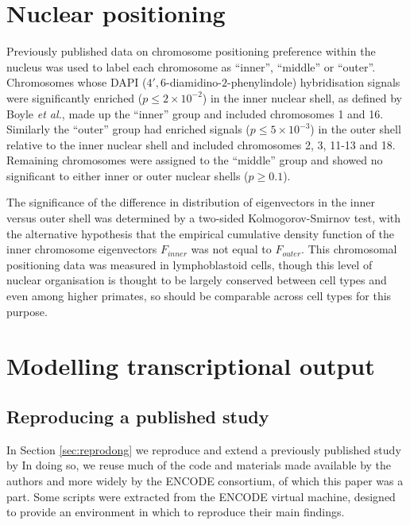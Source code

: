 \documentclass[a4paper,11pt,oneside]{book}
\begin{document}
\section{Nuclear positioning}\label{methods:positioning}

Previously published data  on chromosome positioning preference within
the nucleus was used to label each chromosome as ``inner'', ``middle''
or ``outer''.\cite{Boyle2001} Chromosomes whose DAPI ($4',6$-diamidino-$2$-phenylindole) hybridisation
signals were significantly enriched ($p\leq 2\times10^{-2}$) in the inner nuclear shell, as
defined by Boyle \emph{et al.}\cite{Boyle2001}, made up the ``inner''
group and included chromosomes 1 and 16. Similarly the ``outer'' group
had enriched signals ($p\leq 5\times10^{-3}$) in the outer shell relative to the inner nuclear
shell and included chromosomes 2, 3, 11-13 and 18. Remaining chromosomes were assigned to
the ``middle'' group and showed no significant to either inner or
outer nuclear shells ($p \geq 0.1$).\cite{Boyle2001} 

The significance of the difference in distribution of eigenvectors in the inner
versus outer shell was determined by a two-sided Kolmogorov-Smirnov test, with the alternative hypothesis that the empirical cumulative density function of the inner chromosome eigenvectors $F_{inner}$ was not equal to $F_{outer}$. This chromosomal positioning data was measured in lymphoblastoid cells, though this level of nuclear organisation is thought to be largely conserved
between cell types\cite{Chambers2013, DeWit2013} and even among higher primates,\cite{Tanabe2002} so should be comparable across cell types for this purpose.

\section{Modelling transcriptional output}

\subsection{Reproducing a published study}\label{meth:dong}
In Section \ref{sec:reprodong} we reproduce and extend a previously published study by \citet{Dong2012} In doing so, we reuse much of the code and materials made available by the authors and more widely by the ENCODE consortium,\cite{Dunham2012} of which this paper was a part. Some scripts were extracted from the ENCODE virtual machine,\cite{encodevm} designed to provide an environment in which to reproduce their main findings.\cite{Myers2011}
\end{document}
